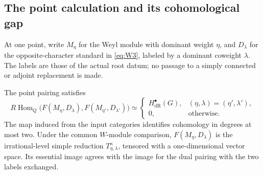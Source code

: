 \subsection{The point calculation and its cohomological gap}

At one point, write $M_\eta$ for the Weyl module with dominant weight
$\eta$, and $D_\lambda$ for the opposite-character standard in
\eqref{eq:W3}, labeled by a dominant coweight $\lambda$.  The labels
are those of the actual root datum; no passage to a simply connected
or adjoint replacement is made.

\begin{lemma}\label{local:point-gap}
The point pairing satisfies
\begin{equation}\label{eq:L10}
 R\operatorname{Hom}_{Q}
 \bigl(F(M_\eta,D_\lambda),F(M_{\eta'},D_{\lambda'})\bigr)
 \simeq
 \begin{cases}
 H^\bullet_{\mathrm{dR}}(G),&
                    (\eta,\lambda)=(\eta',\lambda'),\\
 0,&\text{otherwise}.
 \end{cases}
\end{equation}
The map induced from the input categories identifies cohomology
in degrees at most two.  Under the common $W$-module comparison,
$F(M_\eta,D_\lambda)$ is the irrational-level simple reduction
$T^\kappa_{\eta,\lambda}$, tensored with a one-dimensional vector
space.  Its essential image agrees with the image for the dual
pairing with the two labels exchanged.
\end{lemma}


